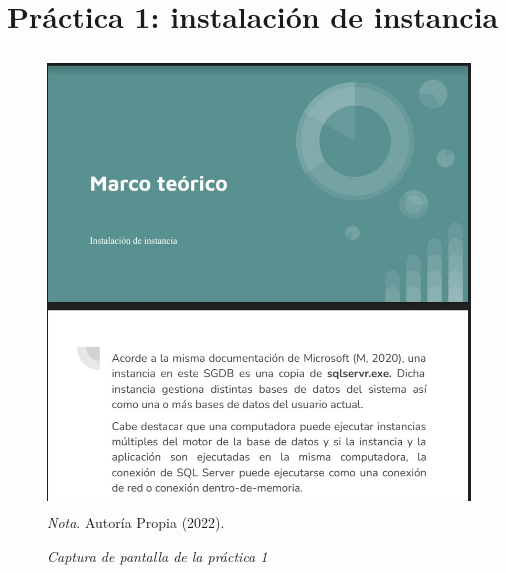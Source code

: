 \documentclass[stu, 12pt, letterpaper, donotrepeattitle, floatsintext, natbib]{apa7}
\begin{document}
\section{Práctica 1: instalación de instancia}
\begin{figure}[H]
    \caption{\emph{Captura de pantalla de la práctica 1\\}}
    \centering
    \smallskip
    \includegraphics[width=17cm, height=12cm]{act2.jpg}
    \bigskip
    \justifying\small\textit{Nota}. %
    Autoría Propia (2022).
\end{figure}
\vspace{\baselineskip}
\end{document}
